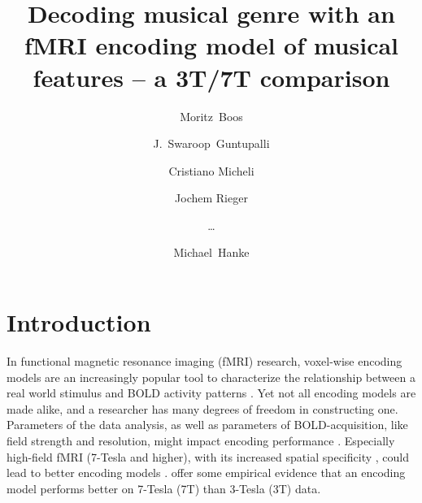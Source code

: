 



\title{Decoding musical genre with an fMRI encoding model of musical
features -- a 3T/7T comparison}


\author[1]{Moritz~Boos}
\author[2]{J.~Swaroop~Guntupalli}
\author[1]{Cristiano Micheli}
\author[1]{Jochem Rieger}
\author[0]{\ldots}
\author[3,4]{Michael~Hanke}

\maketitle

\listoftodos

\begin{abstract}

\end{abstract}

\clearpage


\section*{Introduction}

In functional magnetic resonance imaging (f{MRI}) research, voxel-wise encoding
models are an increasingly popular tool to characterize the relationship
between a real world stimulus and BOLD activity patterns
\citep{NG11,TD+06,KG+08,SZ09}.  Yet not all encoding models are made alike, and
a researcher has many degrees of freedom in constructing one.  Parameters of
the data analysis, as well as parameters of BOLD-acquisition, like field
strength and resolution, might impact encoding performance \citep{KB07,FK12}.
Especially high-field f{MRI} (7-Tesla and higher), with its increased spatial
specificity \citep{THW+05,YU08}, could lead to better encoding models \citep{FK12}. 
\citet{SF14} offer some empirical evidence that an encoding model performs better on
7-Tesla (7T) than 3-Tesla (3T) data.

